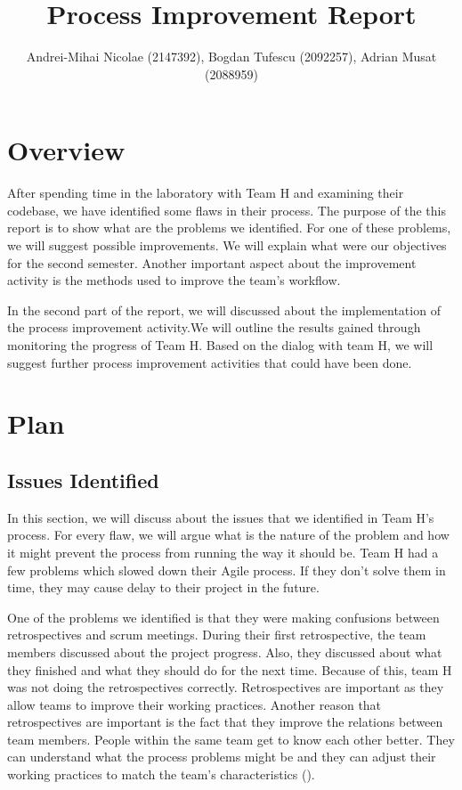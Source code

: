 \documentclass[11pt]{article}
\begin{document}
\title{Process Improvement Report}

\author{Andrei-Mihai Nicolae (2147392), Bogdan Tufescu (2092257), Adrian Musat (2088959)}

\maketitle

\section*{Overview}

  After spending time in the laboratory with Team H and examining their codebase, we have identified some flaws in their process. The purpose of the this report is to show what are the problems we identified. For one of these problems, we will suggest possible improvements. We will explain what were our objectives for the second semester. Another important aspect about the improvement activity is the methods used to improve the team's workflow.
  
  \par
  In the second part of the report, we will discussed about the implementation of the process improvement activity.We will outline the results gained through monitoring the progress of Team H. Based on the dialog with team H, we will suggest further process improvement activities that could have been done.

\section*{Plan}
\subsection*{Issues Identified}

In this section, we will discuss about the issues that we identified in Team H's process. For every flaw, we will argue what is the  nature of the problem and how it might prevent the process from running the way it should be. Team H had a few problems which slowed down their Agile process. If they don't solve them in time, they may cause delay to their project in the future.

\par
One of the problems we identified is that they were making confusions between retrospectives and scrum  meetings. During their first retrospective, the team members discussed about the project progress. Also, they discussed about what they finished and what they should do for the next time. Because of this, team H was not doing the retrospectives correctly. Retrospectives are important as they allow teams to improve their working practices. Another reason that retrospectives are important is the fact that they improve the relations between team members. People within the same team get to know each other better. They can understand what the process problems might be and they can adjust their working practices to match the team's characteristics (\citet{scrumalliance}).
\end{document}

